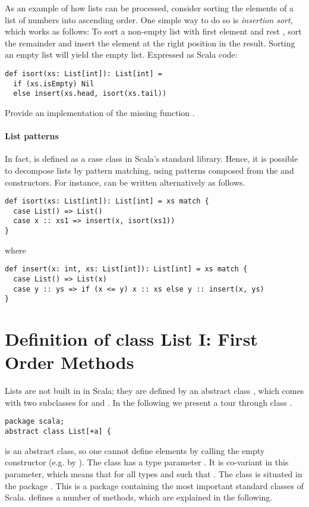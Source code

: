 As an example of how lists can be processed, consider sorting the
elements of a list of numbers into ascending order. One simple way to
do so is {\em insertion sort}, which works as follows: To sort a
non-empty list with first element  and rest , sort
the remainder  and insert the element  at the right
position in the result. Sorting an empty list will yield the
empty list. Expressed as Scala code:
\begin{lstlisting}
def isort(xs: List[int]): List[int] =
  if (xs.isEmpty) Nil
  else insert(xs.head, isort(xs.tail))
\end{lstlisting}

\begin{exercise} Provide an implementation of the missing function
.
\end{exercise}

\paragraph{List patterns} In fact, \code{::} is defined as a case
class in Scala's standard library. Hence, it is possible to decompose
lists by pattern matching, using patterns composed from the 
and \code{::} constructors. For instance,  can be written
alternatively as follows.
\begin{lstlisting}
def isort(xs: List[int]): List[int] = xs match {
  case List() => List()
  case x :: xs1 => insert(x, isort(xs1))
}
\end{lstlisting}
where
\begin{lstlisting}
def insert(x: int, xs: List[int]): List[int] = xs match {
  case List() => List(x)
  case y :: ys => if (x <= y) x :: xs else y :: insert(x, ys)
}
\end{lstlisting}

\section{Definition of class List I: First Order Methods}
\label{sec:list-first-order}

Lists are not built in in Scala; they are defined by an abstract class
, which comes with two subclasses for \code{::} and .
In the following we present a tour through class .
\begin{lstlisting}
package scala;
abstract class List[+a] {
\end{lstlisting}
 is an abstract class, so one cannot define elements by
calling the empty  constructor (e.g. by
).  The class has a type parameter . It is
co-variant in this parameter, which means that
 for all types  and  such that
.  The class is situated in the package
. This is a package containing the most important standard
classes of Scala.
  defines a number of methods, which are
explained in the following.

